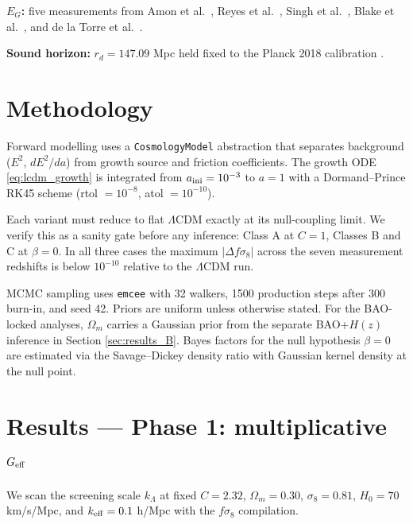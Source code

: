 \documentclass[11pt,a4paper]{article}
\begin{document}
\textbf{$E_G$:} five measurements from Amon et al.\ \cite{Amon2018}, Reyes et al.\ \cite{Reyes2010}, Singh et al.\ \cite{Singh2019}, Blake et al.\ \cite{Blake2016}, and de la Torre et al.\ \cite{delaTorre2017}.

\textbf{Sound horizon:} $r_d = 147.09$ Mpc held fixed to the Planck 2018 calibration \cite{Planck2018}.

\section{Methodology}

Forward modelling uses a \texttt{CosmologyModel} abstraction that separates background ($E^2$, $dE^2/da$) from growth source and friction coefficients. The growth ODE \eqref{eq:lcdm_growth} is integrated from $a_{\rm ini} = 10^{-3}$ to $a = 1$ with a Dormand--Prince RK45 scheme (rtol $=10^{-8}$, atol $=10^{-10}$).

Each variant must reduce to flat $\Lambda$CDM exactly at its null-coupling limit. We verify this as a sanity gate before any inference: Class A at $C = 1$, Classes B and C at $\beta = 0$. In all three cases the maximum $|\Delta f\sigma_8|$ across the seven measurement redshifts is below $10^{-10}$ relative to the $\Lambda$CDM run.

MCMC sampling uses \texttt{emcee} \cite{ForemanMackey2013} with 32 walkers, 1500 production steps after 300 burn-in, and seed 42. Priors are uniform unless otherwise stated. For the BAO-locked analyses, $\Omega_m$ carries a Gaussian prior from the separate BAO+$H(z)$ inference in Section \ref{sec:results_B}. Bayes factors for the null hypothesis $\beta = 0$ are estimated via the Savage--Dickey density ratio with Gaussian kernel density at the null point.

\section{Results --- Phase 1: multiplicative $G_{\rm eff}$}
\label{sec:results_A}

We scan the screening scale $k_\Lambda$ at fixed $C = 2.32$, $\Omega_m = 0.30$, $\sigma_8 = 0.81$, $H_0 = 70$ km/s/Mpc, and $k_{\rm eff} = 0.1$ h/Mpc with the $f\sigma_8$ compilation.
\end{document}
